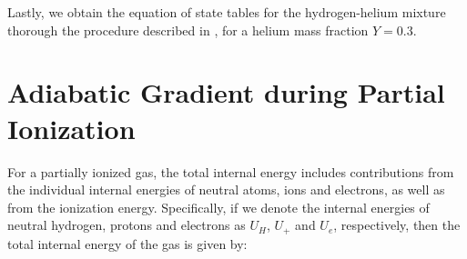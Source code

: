 \documentclass[apj]{emulateapj}
\begin{document}
\vspace{0.2in}

Lastly, we obtain the equation of state tables for the hydrogen-helium mixture thorough the procedure described in \citet{saumon95}, for a helium mass fraction $Y=0.3$.


%
%
%
%


 







\section{Adiabatic Gradient during Partial Ionization}\label{deladioniz}

For a partially ionized gas, the total internal energy includes contributions from the individual internal energies of neutral atoms, ions and electrons, as well as from the ionization energy. Specifically, if we denote the internal energies of neutral hydrogen, protons and electrons as $U_{H}$, $U_+$ and $U_e$, respectively, then the total internal energy of the gas is given by:
\end{document}
